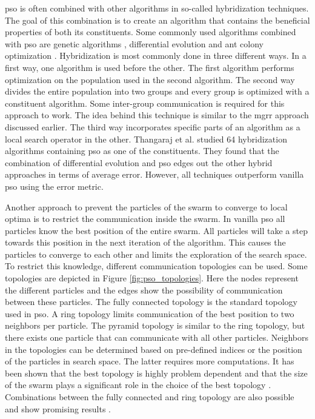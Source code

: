 \begin{minipage}{\textwidth}
\gls{pso} is often combined with other algorithms in so-called hybridization techniques. The goal of this combination is to create an algorithm that contains the beneficial properties of both its constituents. Some commonly used algorithms combined with \gls{pso} are genetic algorithms \cite{genetic_algorithm}, differential evolution \cite{differential_evolution} and ant colony optimization \cite{aco}. Hybridization is most commonly done in three different ways. In a first way, one algorithm is used before the other. The first algorithm performs optimization on the population used in the second algorithm. The second way divides the entire population into two groups and every group is optimized with a constituent algorithm. Some inter-group communication is required for this approach to work. The idea behind this technique is similar to the \gls{mgrr} approach discussed earlier. The third way incorporates specific parts of an algorithm as a local search operator in the other. Thangaraj et al. \cite{hybridization_survey} studied 64 hybridization algorithms containing \gls{pso} as one of the constituents. They found that the combination of differential evolution and \gls{pso} edges out the other hybrid approaches in terms of average error. However, all techniques outperform vanilla \gls{pso} using the error metric.\\
\end{minipage}


Another approach to prevent the particles of the swarm to converge to local optima is to restrict the communication inside the swarm. In vanilla \gls{pso} all particles know the best position of the entire swarm. All particles will take a step towards this position in the next iteration of the algorithm. This causes the particles to converge to each other and limits the exploration of the search space. To restrict this knowledge, different communication topologies can be used. Some topologies are depicted in Figure \ref{fig:pso_topologies}. Here the nodes represent the different particles and the edges show the possibility of communication between these particles. The fully connected topology is the standard topology used in \gls{pso}. A ring topology limits communication of the best position to two neighbors per particle. The pyramid topology is similar to the ring topology, but there exists one particle that can communicate with all other particles. Neighbors in the topologies can be determined based on pre-defined indices or the position of the particles in search space. The latter requires more computations. It has been shown that the best topology is highly problem dependent and that the size of the swarm plays a significant role in the choice of the best topology \cite{pso_topologies}. Combinations between the fully connected and ring topology are also possible and show promising results \cite{fc_ring}.



